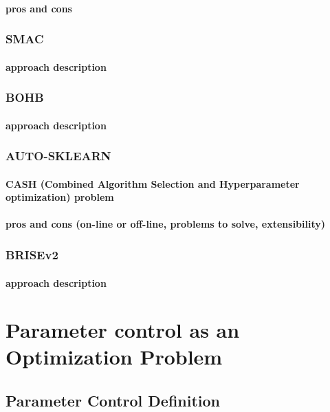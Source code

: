 \paragraph{pros and cons}

\subsubsection{SMAC}
\paragraph{approach description}

\subsubsection{BOHB}
\paragraph{approach description}

\subsubsection{AUTO-SKLEARN}
\paragraph{CASH (Combined Algorithm Selection and Hyperparameter optimization) problem}
\paragraph{pros and cons (on-line or off-line, problems to solve, extensibility)}\cite{autosklearn:feurer2015efficient}

\subsubsection{BRISEv2}
\paragraph{approach description}


\section{Parameter control as an Optimization Problem}\label{bg: parameter control}
\subsection{Parameter Control Definition}
